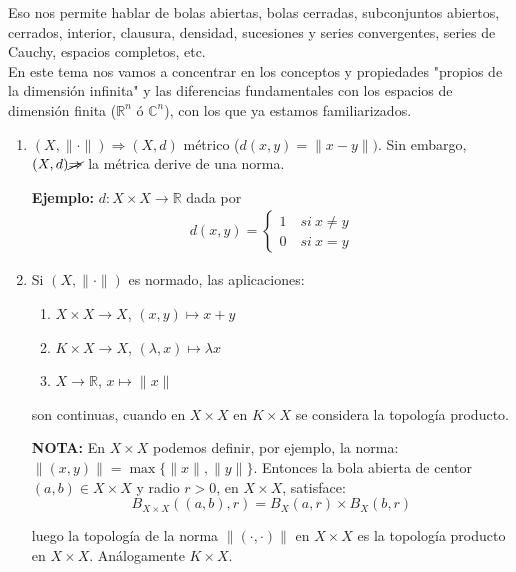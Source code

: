 \documentclass{article}
\begin{document}
Eso nos permite hablar de bolas abiertas, bolas cerradas, subconjuntos abiertos, cerrados, interior, clausura, densidad, sucesiones y series convergentes, series de Cauchy, espacios completos, etc.\\

En este tema nos vamos a concentrar en los conceptos y propiedades "propios de la dimensión infinita" y las diferencias fundamentales con los espacios de dimensión finita ($\mathbb{R}^n$ ó $\mathbb{C}^n$), con los que ya estamos familiarizados.

\begin{enumerate}
\item $(X,\|\cdot\|)\Rightarrow (X,d)$ métrico ($d(x,y)=\|x-y\|)$. Sin embargo, $(X,d)\cancel{\Rightarrow}$ la métrica derive de una norma.

\textbf{Ejemplo:} $d:X\times X\rightarrow \mathbb{R}$ dada por
\begin{gather*}
d(x,y)=\left\lbrace \begin{array}{c}
1\quad si\:x\neq y\\
0\quad si\:x=y
\end{array}\right.
\end{gather*}

\item Si $(X,\|\cdot\|)$ es normado, las aplicaciones:
\begin{enumerate}
\item $X\times X\rightarrow X$, $(x,y)\mapsto x+y$

\item $K\times X\rightarrow X$, $(\lambda,x)\mapsto \lambda x$

\item $X\rightarrow \mathbb{R}$, $x\mapsto \|x\|$
\end{enumerate}

son continuas, cuando en $X\times X$  en $K\times X$ se considera la topología producto.

\textbf{NOTA:} En $X\times X$ podemos definir, por ejemplo, la norma: $\|(x,y)\|=\max\{\|x\|,\|y\|\}$. Entonces la bola abierta de centor $(a,b)\in X\times X$ y radio $r>0$, en $X\times X$, satisface:
\begin{equation*}
B_{X\times X}((a,b),r)=B_X(a,r)\times B_X(b,r)
\end{equation*}

luego la topología de la norma $\|(\cdot,\cdot)\|$ en $X\times X$ es la topología producto en $X\times X$. Análogamente $K\times X$.\\


\end{enumerate}
\end{document}
